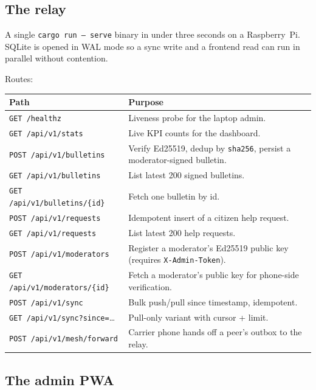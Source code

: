 \documentclass[11pt,a4paper]{article}
\begin{document}
\subsection{The relay}
\label{sec:relay}

A single \texttt{cargo run -- serve} binary in under three seconds on
a Raspberry~Pi. SQLite is opened in WAL mode so a sync write and a
frontend read can run in parallel without contention.

Routes:
\begin{center}
\begin{tabularx}{\linewidth}{@{}lX@{}}
\toprule
\textbf{Path} & \textbf{Purpose}\\
\midrule
\texttt{GET  /healthz} & Liveness probe for the laptop admin.\\
\texttt{GET  /api/v1/stats} & Live KPI counts for the dashboard.\\
\texttt{POST /api/v1/bulletins} & Verify Ed25519, dedup by \texttt{sha256}, persist a moderator-signed bulletin.\\
\texttt{GET  /api/v1/bulletins} & List latest 200 signed bulletins.\\
\texttt{GET  /api/v1/bulletins/\{id\}} & Fetch one bulletin by id.\\
\texttt{POST /api/v1/requests} & Idempotent insert of a citizen help request.\\
\texttt{GET  /api/v1/requests} & List latest 200 help requests.\\
\texttt{POST /api/v1/moderators} & Register a moderator's Ed25519 public key (requires \texttt{X-Admin-Token}).\\
\texttt{GET  /api/v1/moderators/\{id\}} & Fetch a moderator's public key for phone-side verification.\\
\texttt{POST /api/v1/sync} & Bulk push/pull since timestamp, idempotent.\\
\texttt{GET  /api/v1/sync?since=}\ldots & Pull-only variant with cursor + limit.\\
\texttt{POST /api/v1/mesh/forward} & Carrier phone hands off a peer's outbox to the relay.\\
\bottomrule
\end{tabularx}
\end{center}

\subsection{The admin PWA}
\label{sec:admin}
\end{document}
